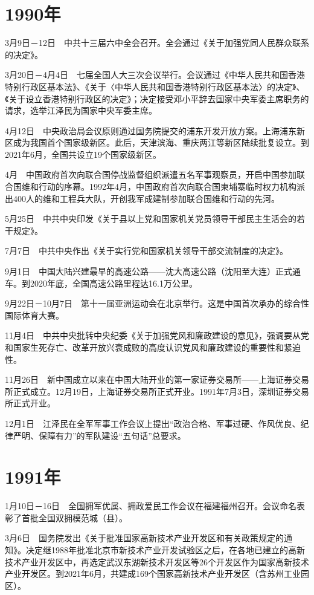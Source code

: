 \documentclass[10pt,a4paper,twocolumn]{book}
\begin{document}
\section{1990年}

3月9日－12日　中共十三届六中全会召开。全会通过《关于加强党同人民群众联系的决定》。

3月20日－4月4日　七届全国人大三次会议举行。会议通过《中华人民共和国香港特别行政区基本法》、《关于〈中华人民共和国香港特别行政区基本法〉的决定》、《关于设立香港特别行政区的决定》；决定接受邓小平辞去国家中央军委主席职务的请求，选举江泽民为国家中央军委主席。

4月12日　中央政治局会议原则通过国务院提交的浦东开发开放方案。上海浦东新区成为我国首个国家级新区。此后，天津滨海、重庆两江等新区陆续批复设立。到2021年6月，全国共设立19个国家级新区。

4月　中国政府首次向联合国停战监督组织派遣五名军事观察员，开启中国参加联合国维和行动的序幕。1992年4月，中国政府首次向联合国柬埔寨临时权力机构派出400人的维和工程兵大队，开创我军成建制参加联合国维和行动的先河。

5月25日　中共中央印发《关于县以上党和国家机关党员领导干部民主生活会的若干规定》。

7月7日　中共中央作出《关于实行党和国家机关领导干部交流制度的决定》。

9月1日　中国大陆兴建最早的高速公路——沈大高速公路（沈阳至大连）正式通车。到2020年底，全国高速公路里程达16.1万公里。

9月22日－10月7日　第十一届亚洲运动会在北京举行。这是中国首次承办的综合性国际体育大赛。

11月4日　中共中央批转中央纪委《关于加强党风和廉政建设的意见》，强调要从党和国家生死存亡、改革开放兴衰成败的高度认识党风和廉政建设的重要性和紧迫性。

11月26日　新中国成立以来在中国大陆开业的第一家证券交易所——上海证券交易所正式成立。12月19日，上海证券交易所正式开业。1991年7月3日，深圳证券交易所正式开业。

12月1日　江泽民在全军军事工作会议上提出“政治合格、军事过硬、作风优良、纪律严明、保障有力”的军队建设“五句话”总要求。

\section{1991年}

1月10日－16日　全国拥军优属、拥政爱民工作会议在福建福州召开。会议命名表彰了首批全国双拥模范城（县）。

3月6日　国务院发出《关于批准国家高新技术产业开发区和有关政策规定的通知》。决定继1988年批准北京市新技术产业开发试验区之后，在各地已建立的高新技术产业开发区中，再选定武汉东湖新技术开发区等26个开发区作为国家高新技术产业开发区。到2021年6月，共建成169个国家高新技术产业开发区（含苏州工业园区）。
\end{document}

